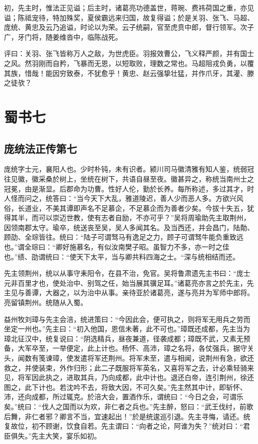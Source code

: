 \documentclass[12pt,UTF8]{ctexbook}
\begin{document}
初，先主时，惟法正见谥；后主时，诸葛亮功德盖世，蒋琬、费祎荷国之重，亦见谥；陈祗宠待，特加殊奖，夏侯霸远来归国，故复得谥；於是关羽、张飞、马超、庞统、黄忠及云乃追谥，时论以为荣。云子统嗣，官至虎贲中郎，督行领军。次子广，牙门将，随姜维沓中，临陈战死。

评曰：关羽、张飞皆称万人之敌，为世虎臣。羽报效曹公，飞义释严颜，并有国士之风。然羽刚而自矜，飞暴而无恩，以短取败，理数之常也。马超阻戎负勇，以覆其族，惜哉！能因穷致泰，不犹愈乎！黄忠、赵云强挚壮猛，并作爪牙，其灌、滕之徒欤？

\part{蜀书七}
\chapter{庞统法正传第七}

庞统字士元，襄阳人也。少时朴钝，未有识者。颍川司马徽清雅有知人鉴，统弱冠往见徽，徽采桑於树上，坐统在树下，共语自昼至夜。徽甚异之，称统当南州士之冠冕，由是渐显。后郡命为功曹。性好人伦，勤於长养。每所称述，多过其才，时人怪而问之，统答曰：“当今天下大乱，雅道陵迟，善人少而恶人多。方欲兴风俗，长道业，不美其谭即声名不足慕企，不足慕企而为善者少矣。今拔十失五，犹得其半，而可以崇迈世教，使有志者自励，不亦可乎？”吴将周瑜助先主取荆州，因领南郡太守。瑜卒，统送丧至吴，吴人多闻其名。及当西还，并会昌门，陆勣、顾劭、全琮皆往。统曰：“陆子可谓驽马有逸足之力，顾子可谓驽牛能负重致远也。”谓全琮曰：“卿好施慕名，有似汝南樊子昭。虽智力不多，亦一时之佳也。”绩、劭谓统曰：“使天下太平，当与卿共料四海之士。“深与统相结而还。

先主领荆州，统以从事守耒阳令，在县不治，免官。吴将鲁肃遗先主书曰：“庞士元非百里才也，使处治中、别驾之任，始当展其骥足耳。”诸葛亮亦言之於先主，先主见与善谭，大器之，以为治中从事。亲待亚於诸葛亮，遂与亮并为军师中郎将。亮留镇荆州。统随从入蜀。

益州牧刘璋与先主会涪，统进策曰：“今因此会，便可执之，则将军无用兵之劳而坐定一州也。”先主曰：“初入他国，恩信未著，此不可也。”璋既还成都，先主当为璋北征汉中，统复说曰：“阴选精兵，昼夜兼道，径袭成都；璋既不武，又素无预备，大军卒至，一举便定，此上计也。杨怀、高沛，璋之名将，各仗强兵，据守关头，闻数有笺谏璋，使发遣将军还荆州。将军未至，遣与相闻，说荆州有急，欲还救之，并使装束，外作归形；此二子既服将军英名，又喜将军之去，计必乘轻骑来见，将军因此执之，进取其兵，乃向成都，此中计也。退还白帝，连引荆州，徐还图之，此下计也。若沈吟不去，将致大因，不可久矣。”先主然其中计，即斩怀、沛，还向成都，所过辄克。於涪大会，置酒作乐，谓统曰：“今日之会，可谓乐矣。”统曰：“伐人之国而以为欢，非仁者之兵也。”先主醉，怒曰：“武王伐纣，前歌后舞，非仁者邪？卿言不当，宜速起出！”於是统逡巡引退。先主寻悔，请还。统复故位，初不顾谢，饮食自若。先主谓曰：“向者之论，阿谁为失？”统对曰：“君臣俱失。”先主大笑，宴乐如初。
\end{document}
